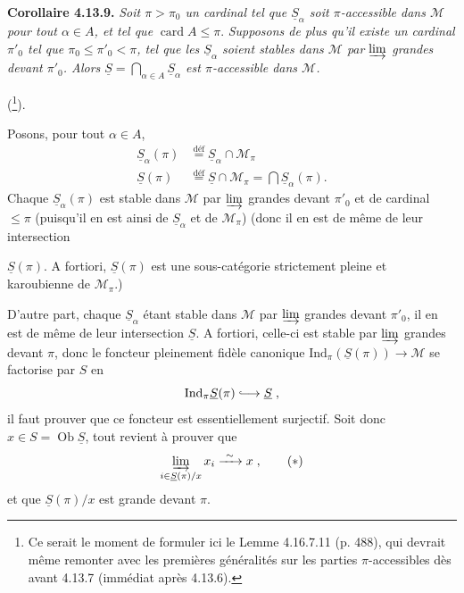 \documentclass[11pt]{article}
\newcommand{\printedpage}[1]{\marginpar{\footnotesize p.~#1}}
\newcommand{\msp}[1]{\marginpar{\footnotesize [#1]}}
\newcommand{\Ind}{\mathrm{Ind}}
\newcommand{\Ob}{\operatorname{Ob}}
\newcommand{\card}{\operatorname{card}}
\newcommand{\M}{\mathcal{M}}
\newcommand{\uS}{\underline{S}}
\newcommand{\incl}{\lhook\joinrel\longrightarrow}
\begin{document}
\textbf{Corollaire 4.13.9.} \textit{Soit $\pi > \pi_0$ un cardinal tel que $\uS_\alpha$ soit $\pi$-accessible dans $\M$ pour tout $\alpha \in A$, et tel que} $\card A \leqslant \pi$. \textit{Supposons de plus qu'il existe un cardinal $\pi'_0$ tel que $\pi_0 \leqslant \pi'_0 < \pi$, tel que les $\uS_\alpha$ soient stables dans $\M$ par $\varinjlim$ grandes devant $\pi'_0$. Alors $\uS = \bigcap_{\alpha\in A} \uS_\alpha$ est $\pi$-accessible dans $\M$.}

(\footnote[124]{Ce serait le moment de formuler ici le Lemme 4.16.7.11 (p. 488), qui devrait même remonter avec les premières généralités sur les parties $\pi$-accessibles dès avant 4.13.7 (immédiat après 4.13.6).}).

Posons, pour tout $\alpha \in A$,
\[
\begin{aligned}
\uS_\alpha(\pi) &\overset{\text{déf}}{=} \uS_\alpha \cap \M_\pi \\
\uS(\pi) &\overset{\text{déf}}{=} \uS \cap \M_\pi = \bigcap \uS_\alpha(\pi) .
\end{aligned}
\]
Chaque $\uS_\alpha(\pi)$ est stable dans $\M$ par $\varinjlim$ grandes devant $\pi'_0$ et de cardinal $\leqslant \pi$ (puisqu'il en est ainsi de $\uS_\alpha$ et de $\M_\pi$) (donc il en est de même de leur intersection

\msp{page 293}
$\uS(\pi)$. A fortiori, $\uS(\pi)$ est une sous-catégorie strictement pleine et karoubienne de $\M_\pi$.)

\printedpage{109}

D'autre part, chaque $\underline{S}_\alpha$ étant stable dans $\mathcal{M}$ par $\varinjlim$ grandes devant $\pi'_0$, il en est de même de leur intersection $\underline{S}$. A fortiori, celle-ci est stable par $\varinjlim$ grandes devant $\pi$, donc le foncteur pleinement fidèle canonique $\Ind_\pi(\underline{S}(\pi))\longrightarrow\mathcal{M}$ se factorise par $S$ en
\[ \Ind_\pi\underline{S}(\pi) \incl \underline{S} \; , \]
il faut prouver que ce foncteur est essentiellement surjectif. Soit donc $x\in S=\Ob\underline{S}$, tout revient à prouver que
\[ \varinjlim_{i\in\underline{S}(\pi)/x} x_i \xrightarrow{\ \sim\ } x \; , \tag*{$(*)$} \]
et que $\underline{S}(\pi)/x$ est grande devant $\pi$.
\end{document}
